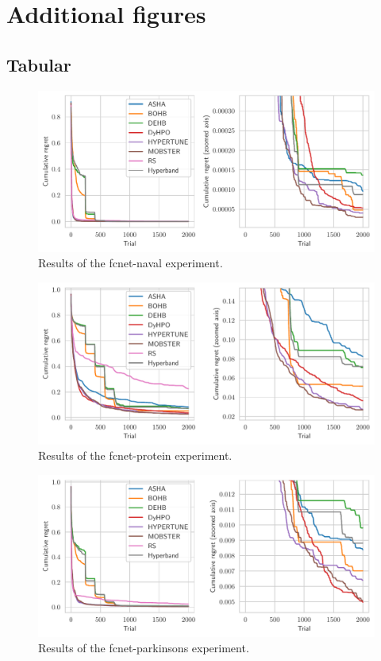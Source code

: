 \chapter{Additional figures}
\label{ch:results_appendix}

\section{Tabular}

\begin{figure}[H]
    \centering
    \includegraphics[scale=0.65]{img/tabular_exp/fcnet-naval_plot.pdf}
    \caption{Results of the fcnet-naval experiment.}
\end{figure}

\begin{figure}[H]
    \centering
    \includegraphics[scale=0.65]{img/tabular_exp/fcnet-protein_plot.pdf}
    \caption{Results of the fcnet-protein experiment.}
\end{figure}


\begin{figure}[H]
    \centering
    \includegraphics[scale=0.65]{img/tabular_exp/fcnet-parkinsons_plot.pdf}
    \caption{Results of the fcnet-parkinsons experiment.}
\end{figure}

